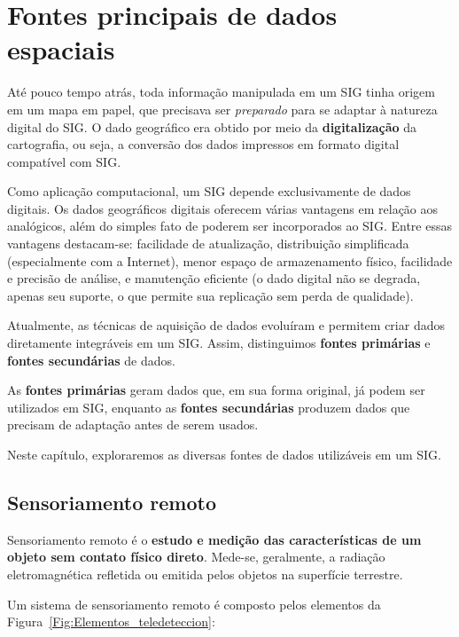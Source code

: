 \chapter{Fontes principais de dados espaciais}

\pagestyle{fancy}

Até pouco tempo atrás, toda informação manipulada em um SIG tinha origem em um mapa em papel, que precisava ser \emph{preparado} para se adaptar à natureza digital do SIG. O dado geográfico era obtido por meio da \textbf{digitalização} da cartografia, ou seja, a conversão dos dados impressos em formato digital compatível com SIG.

Como aplicação computacional, um SIG depende exclusivamente de dados digitais. Os dados geográficos digitais oferecem várias vantagens em relação aos analógicos, além do simples fato de poderem ser incorporados ao SIG. Entre essas vantagens destacam-se: facilidade de atualização, distribuição simplificada (especialmente com a Internet), menor espaço de armazenamento físico, facilidade e precisão de análise, e manutenção eficiente (o dado digital não se degrada, apenas seu suporte, o que permite sua replicação sem perda de qualidade).

Atualmente, as técnicas de aquisição de dados evoluíram e permitem criar dados diretamente integráveis em um SIG. Assim, distinguimos \textbf{fontes primárias} e \textbf{fontes secundárias} de dados.

As \textbf{fontes primárias} geram dados que, em sua forma original, já podem ser utilizados em SIG, enquanto as \textbf{fontes secundárias} produzem dados que precisam de adaptação antes de serem usados.

Neste capítulo, exploraremos as diversas fontes de dados utilizáveis em um SIG.

\section{Sensoriamento remoto}

Sensoriamento remoto é o \textbf{estudo e medição das características de um objeto sem contato físico direto}. Mede-se, geralmente, a radiação eletromagnética refletida ou emitida pelos objetos na superfície terrestre.

Um sistema de sensoriamento remoto é composto pelos elementos da Figura~\ref{Fig:Elementos_teledeteccion}:


